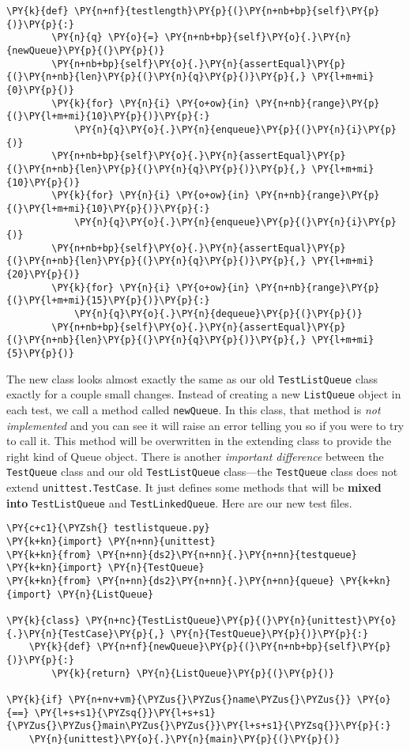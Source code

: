 \begin{Verbatim}[commandchars=\\\{\}]
    \PY{k}{def} \PY{n+nf}{testlength}\PY{p}{(}\PY{n+nb+bp}{self}\PY{p}{)}\PY{p}{:}
        \PY{n}{q} \PY{o}{=} \PY{n+nb+bp}{self}\PY{o}{.}\PY{n}{newQueue}\PY{p}{(}\PY{p}{)}
        \PY{n+nb+bp}{self}\PY{o}{.}\PY{n}{assertEqual}\PY{p}{(}\PY{n+nb}{len}\PY{p}{(}\PY{n}{q}\PY{p}{)}\PY{p}{,} \PY{l+m+mi}{0}\PY{p}{)}
        \PY{k}{for} \PY{n}{i} \PY{o+ow}{in} \PY{n+nb}{range}\PY{p}{(}\PY{l+m+mi}{10}\PY{p}{)}\PY{p}{:}
            \PY{n}{q}\PY{o}{.}\PY{n}{enqueue}\PY{p}{(}\PY{n}{i}\PY{p}{)}
        \PY{n+nb+bp}{self}\PY{o}{.}\PY{n}{assertEqual}\PY{p}{(}\PY{n+nb}{len}\PY{p}{(}\PY{n}{q}\PY{p}{)}\PY{p}{,} \PY{l+m+mi}{10}\PY{p}{)}
        \PY{k}{for} \PY{n}{i} \PY{o+ow}{in} \PY{n+nb}{range}\PY{p}{(}\PY{l+m+mi}{10}\PY{p}{)}\PY{p}{:}
            \PY{n}{q}\PY{o}{.}\PY{n}{enqueue}\PY{p}{(}\PY{n}{i}\PY{p}{)}
        \PY{n+nb+bp}{self}\PY{o}{.}\PY{n}{assertEqual}\PY{p}{(}\PY{n+nb}{len}\PY{p}{(}\PY{n}{q}\PY{p}{)}\PY{p}{,} \PY{l+m+mi}{20}\PY{p}{)}
        \PY{k}{for} \PY{n}{i} \PY{o+ow}{in} \PY{n+nb}{range}\PY{p}{(}\PY{l+m+mi}{15}\PY{p}{)}\PY{p}{:}
            \PY{n}{q}\PY{o}{.}\PY{n}{dequeue}\PY{p}{(}\PY{p}{)}
        \PY{n+nb+bp}{self}\PY{o}{.}\PY{n}{assertEqual}\PY{p}{(}\PY{n+nb}{len}\PY{p}{(}\PY{n}{q}\PY{p}{)}\PY{p}{,} \PY{l+m+mi}{5}\PY{p}{)}
\end{Verbatim}



The new class looks almost exactly the same as our old \texttt{TestListQueue} class exactly for a couple small changes.
Instead of creating a new \texttt{ListQueue} object in each test, we call a method called \texttt{newQueue}.
In this class, that method is \emph{not implemented} and you can see it will raise an error telling you so if you were to try to call it.
This method will be overwritten in the extending class to provide the right kind of Queue object.
There is another \emph{important difference} between the \texttt{TestQueue} class and our old \texttt{TestListQueue} class---the \texttt{TestQueue} class does not extend \texttt{unittest.TestCase}.
It just defines some methods that will be \textbf{mixed into} \texttt{TestListQueue} and \texttt{TestLinkedQueue}.
Here are our new test files.


\begin{Verbatim}[commandchars=\\\{\}]
\PY{c+c1}{\PYZsh{} testlistqueue.py}
\PY{k+kn}{import} \PY{n+nn}{unittest}
\PY{k+kn}{from} \PY{n+nn}{ds2}\PY{n+nn}{.}\PY{n+nn}{testqueue} \PY{k+kn}{import} \PY{n}{TestQueue}
\PY{k+kn}{from} \PY{n+nn}{ds2}\PY{n+nn}{.}\PY{n+nn}{queue} \PY{k+kn}{import} \PY{n}{ListQueue}

\PY{k}{class} \PY{n+nc}{TestListQueue}\PY{p}{(}\PY{n}{unittest}\PY{o}{.}\PY{n}{TestCase}\PY{p}{,} \PY{n}{TestQueue}\PY{p}{)}\PY{p}{:}
    \PY{k}{def} \PY{n+nf}{newQueue}\PY{p}{(}\PY{n+nb+bp}{self}\PY{p}{)}\PY{p}{:}
        \PY{k}{return} \PY{n}{ListQueue}\PY{p}{(}\PY{p}{)}

\PY{k}{if} \PY{n+nv+vm}{\PYZus{}\PYZus{}name\PYZus{}\PYZus{}} \PY{o}{==} \PY{l+s+s1}{\PYZsq{}}\PY{l+s+s1}{\PYZus{}\PYZus{}main\PYZus{}\PYZus{}}\PY{l+s+s1}{\PYZsq{}}\PY{p}{:}
    \PY{n}{unittest}\PY{o}{.}\PY{n}{main}\PY{p}{(}\PY{p}{)}
\end{Verbatim}

